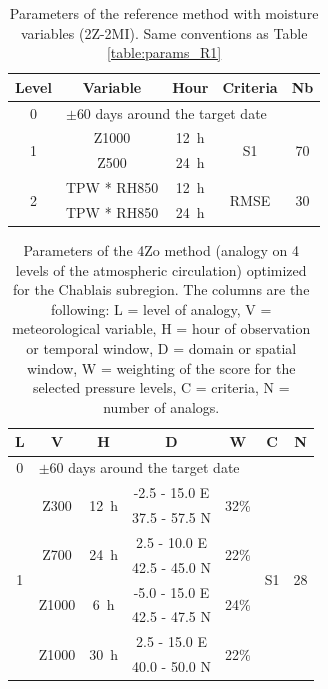 \documentclass[review]{elsarticle}
\begin{document}
\begin{table}[t]
	\caption{Parameters of the reference method with moisture variables (2Z-2MI). Same conventions as Table \ref{table:params_R1}}
	\footnotesize
	\begin{center}
		\begin{tabular}{ccccc}
			\hline 
			Level & Variable & Hour & Criteria & Nb \\ 
			\hline 
			0 & \multicolumn{4}{l}{$\pm 60$ days around the target date} \\
			\hline 
			\multirow{2}{*}{1} & Z1000 & 12~h & \multirow{2}{*}{S1} & \multirow{2}{*}{70} \\
			& Z500 & 24~h & & \\ 
			\hline
			\multirow{2}{*}{2} & TPW * RH850 & 12~h & \multirow{2}{*}{RMSE} & \multirow{2}{*}{30} \\
			& TPW * RH850 & 24~h & & \\ 
			\hline 
		\end{tabular} 
	\end{center}
	\label{table:params_R2}
\end{table}

\begin{table}[t]
	\caption{Parameters of the 4Zo method (analogy on 4 levels of the atmospheric circulation) optimized for the Chablais subregion. The columns are the following: L = level of analogy, V = meteorological variable, H = hour of observation or temporal window, D = domain or spatial window, W = weighting of the score for the selected pressure levels, C = criteria, N = number of analogs.}
	\footnotesize
	\begin{center}
		\begin{tabular}{ccccccc}
			\hline L & V & H & D & W & C & N \\ 
			\hline 
			0 & \multicolumn{6}{l}{$\pm 60$ days around the target date} \\
			\hline 
			\multirow{8}{*}{1} &  \multirow{2}{*}{Z300} & \multirow{2}{*}{12~h} & -2.5 - 15.0 \degree E & \multirow{2}{*}{32\%} & \multirow{8}{*}{S1} & \multirow{8}{*}{28} \\
			& & & 37.5 - 57.5 \degree N & & & \\ 
			& \multirow{2}{*}{Z700} & \multirow{2}{*}{24~h} & 2.5 - 10.0 \degree E & \multirow{2}{*}{22\%} & & \\ 
			& & & 42.5 - 45.0 \degree N & & & \\ 
			& \multirow{2}{*}{Z1000} & \multirow{2}{*}{6~h} & -5.0 - 15.0 \degree E & \multirow{2}{*}{24\%} & & \\ 
			& & & 42.5 - 47.5 \degree N & & & \\ 
			& \multirow{2}{*}{Z1000} & \multirow{2}{*}{30~h} & 2.5 - 15.0 \degree E & \multirow{2}{*}{22\%} & & \\ 
			& & & 40.0 - 50.0 \degree N & & & \\ 
			\hline 
		\end{tabular} 
	\end{center}
	\label{table:params_GA_4Zo}
\end{table}
\end{document}
